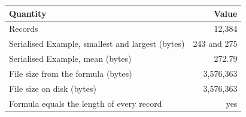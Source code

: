 \begin{tabular}{p{9cm}r}
\toprule
Quantity & Value \\
\midrule
Records & 12,384 \\
Serialised Example, smallest and largest (bytes) & 243 and 275 \\
Serialised Example, mean (bytes) & 272.79 \\
File size from the formula (bytes) & 3,576,363 \\
File size on disk (bytes) & 3,576,363 \\
Formula equals the length of every record & yes \\
\bottomrule
\end{tabular}
